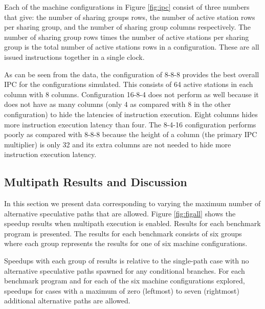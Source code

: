 \documentclass[10pt,dvips]{article}
\begin{document}
Each of the machine configurations in Figure \ref{fig:ipc} consist of
three numbers that give: the number of sharing groups rows, the number of
active station rows per sharing group, and the number of sharing group
columns respectively.  The number of sharing group rows times the number
of active stations per sharing group is the total number of active
stations rows in a configuration.  These are all issued instructions
together in a single clock.

As can be seen from the data, the configuration of 8-8-8 provides
the best overall IPC for the configurations simulated.  This consists
of 64 active stations in each column with 8 columns.
Configuration 16-8-4 does not perform as well because it does not
have as many columns (only 4 as compared with 8 in the other configuration)
to hide the latencies of instruction execution.  Eight columns 
hides more instruction execution latency than four.  The 8-4-16
configuration performs poorly as compared with 8-8-8 because the height
of a column (the primary IPC multiplier) is only 32 and its extra
columns are not needed to hide more instruction execution latency.
%
\subsection{Multipath Results and Discussion}
%
In this section we present data corresponding to varying the
maximum number of alternative speculative paths that are allowed.
Figure \ref{fig:figall} shows the speedup results
when multipath execution is enabled.  Results for
each benchmark program is presented.  The results for each benchmark 
consists of six groups where each group represents the results
for one of six machine configurations.

Speedups with each group of results is relative to the
single-path case with no alternative speculative paths spawned
for any conditional branches.  For each benchmark program and
for each of the six machine configurations explored, speedups
for cases with a maximum
of zero (leftmost) to seven (rightmost) additional alternative 
paths are allowed.
\end{document}
